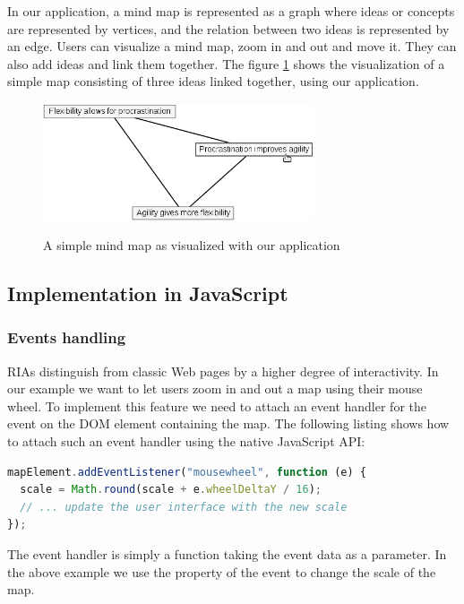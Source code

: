 \documentclass[american,english,runningheads]{llncs}
\begin{document}
In our application, a mind map is represented as a graph where ideas or concepts are represented by vertices, and the
relation between two ideas is represented by an edge. Users can visualize a mind map, zoom in and out and move it.
They can also add ideas and link them together. The figure \ref{mindmap} shows the visualization of a simple map
consisting of three ideas linked together, using our application.

\begin{figure}
 \caption{A simple mind map as visualized with our application}
 \centering
 \includegraphics[width=8cm]{mindmap.png}
 \label{mindmap}
\end{figure}

\subsection{Implementation in JavaScript}

\subsubsection{Events handling}

RIAs distinguish from classic Web pages by a higher degree of interactivity. In our example we want to let users zoom
in and out a map using their mouse wheel. To implement this feature we need to attach an event handler for the
 event on the DOM element containing the map. The following listing shows how to attach such an
event handler using the native JavaScript API:

\begin{lstlisting}[language=JavaScript,label=event-js,caption=Native JavaScript API to handle events]
mapElement.addEventListener("mousewheel", function (e) {
  scale = Math.round(scale + e.wheelDeltaY / 16);
  // ... update the user interface with the new scale
});
\end{lstlisting}

The event handler is simply a function taking the event data as a parameter. In the above example we use the
 property of the event to change the scale of the map.
\end{document}
